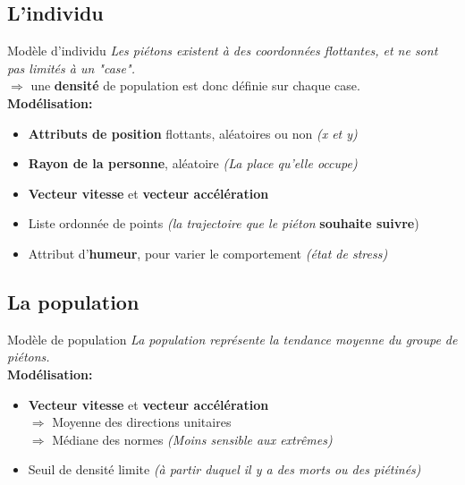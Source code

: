 \documentclass[11pt]{beamer}
\begin{document}
    \subsection{L'individu}
    
\begin{frame}{Modèle d'individu}
\textit{Les  piétons existent à des coordonnées flottantes, et ne sont pas limités à un "case".}\\
$\Rightarrow$ une \textbf{densité} de population est donc définie sur chaque case.\\
\vspace{0.5cm}
\textbf{\large Modélisation:}
\begin{itemize}
\item \textbf{Attributs de position} flottants, aléatoires ou non \textit{(x et y)}
\item \textbf{Rayon de la personne}, aléatoire \textit{(La place qu'elle occupe)}
\item \textbf{Vecteur vitesse} et \textbf{vecteur accélération}
\item Liste ordonnée de points \textit{(la trajectoire que le piéton} \textbf{souhaite suivre})
\item Attribut d'\textbf{humeur}, pour varier le comportement \textit{(état de stress)}
\end{itemize}
\end{frame}


    \subsection{La population}

\begin{frame}{Modèle de population}
\textit{La population représente la tendance moyenne du groupe de piétons.}\\
\vspace{0.5cm}
\textbf{\large Modélisation:}
\begin{itemize}
\item \textbf{Vecteur vitesse} et \textbf{vecteur accélération}\\
$\Rightarrow$ Moyenne des directions unitaires\\
$\Rightarrow$ Médiane des normes \textit{(Moins sensible aux extrêmes)}
\item Seuil de densité limite \textit{(à partir duquel il y a des morts ou des piétinés)}
\end{itemize}
\end{frame}
\end{document}
